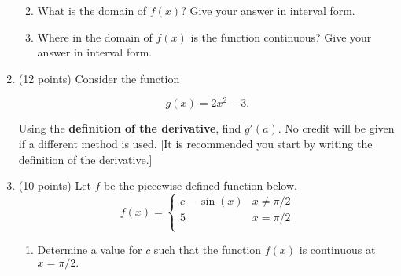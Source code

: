 \documentclass[11pt]{article}
\renewcommand{\d}{\displaystyle}
\begin{document}
\begin{enumerate}
\begin{enumerate}

\vspace{1cm}

\item What is the domain of $f(x)$? Give your answer in interval form.\\

\vfill

\item Where in the domain of $f(x)$ is the function continuous? Give your answer in interval form.
\vfill

\vspace{\mysep}
\end{enumerate}
\newpage


\item (12 points) Consider the function

$$
g(x) = 2x^2 - 3.
$$

Using the \textbf{definition of the derivative}, find $g'(a)$. No credit will be given if a different method is used. [It is recommended you start by writing the definition of the derivative.] 

\newpage
\item (10 points) Let $f$ be the piecewise defined function below.
$$f(x)=\begin{cases} c-\sin (x) & x \not= \pi/2 \\ 5 & x=\pi/2 \\
\end{cases}$$
\begin{enumerate}
	\item Determine a value for $c$ such that the function $f(x)$ is continuous at $x=\pi/2.$
\vfill


\end{enumerate}
\end{enumerate}
\end{document}
